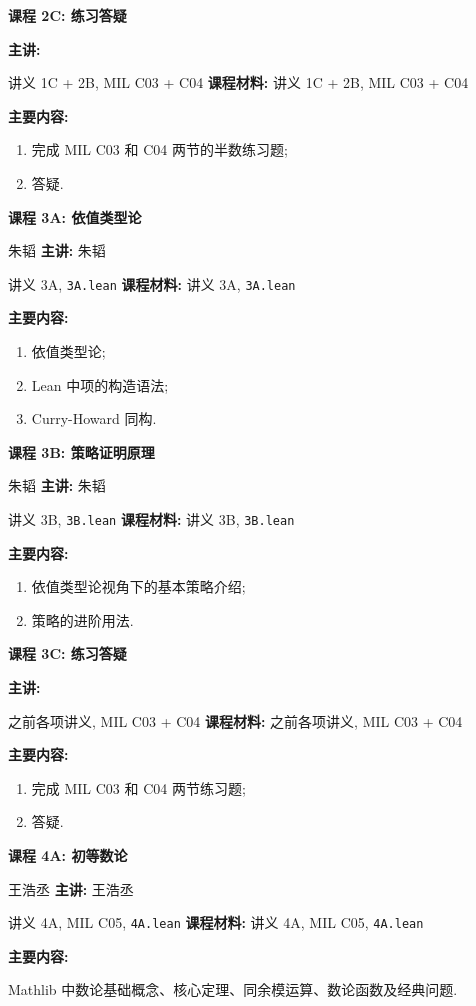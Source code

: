 \documentclass[UTF8]{ctexart}
\DeclareMathOperator{\0}{\mathbf{0}}                    %
\newcommand{\<}{\langle}
\renewcommand{\>}{\rangle}                              %
\newenvironment{thm_box}{
    \begin{tcolorbox}[enhanced, colback=thm_blue2, boxrule=0pt, frame hidden,
        borderline west={0.7mm}{0.1mm}{thm_blue1},breakable]
    }
    {\end{tcolorbox}}
\theoremstyle{MyStyle} %
\newenvironment{crs}[4]
{
    \begin{thm_box}
        \textbf{课程 #1: #2}
        
        \ifx\relax#3\relax\else %
            \textbf{主讲: }#3 %
        \fi
        
        \ifx\relax#4\relax\else %
            \textbf{课程材料: }#4 %
        \fi

        \textbf{主要内容: }
}
{
    \end{thm_box}
}
\begin{document}
            \begin{crs}
                {2C}
                {练习答疑}
                {}
                {讲义 1C + 2B, MIL C03 + C04}
                \begin{enumerate}
                    \item 完成 MIL C03 和 C04 两节的半数练习题; 
                    \item 答疑. 
                \end{enumerate}
            \end{crs}

            \begin{crs}
                {3A}
                {依值类型论}
                {朱韬}
                {讲义 3A, \texttt{3A.lean}}
                \begin{enumerate}
                    \item 依值类型论; 
                    \item Lean 中项的构造语法; 
                    \item Curry-Howard 同构. 
                \end{enumerate}
            \end{crs}

            \begin{crs}
                {3B}
                {策略证明原理}
                {朱韬}
                {讲义 3B, \texttt{3B.lean}}
                \begin{enumerate}
                    \item 依值类型论视角下的基本策略介绍; 
                    \item 策略的进阶用法. 
                \end{enumerate}
            \end{crs}

            \begin{crs}
                {3C}
                {练习答疑}
                {}
                {之前各项讲义, MIL C03 + C04}
                \begin{enumerate}
                    \item 完成 MIL C03 和 C04 两节练习题; 
                    \item 答疑. 
                \end{enumerate}
            \end{crs}

            \begin{crs}
                {4A}
                {初等数论}
                {王浩丞}
                {讲义 4A, MIL C05, \texttt{4A.lean}}
                Mathlib 中数论基础概念、核心定理、同余模运算、数论函数及经典问题. 
            \end{crs}
\end{document}
